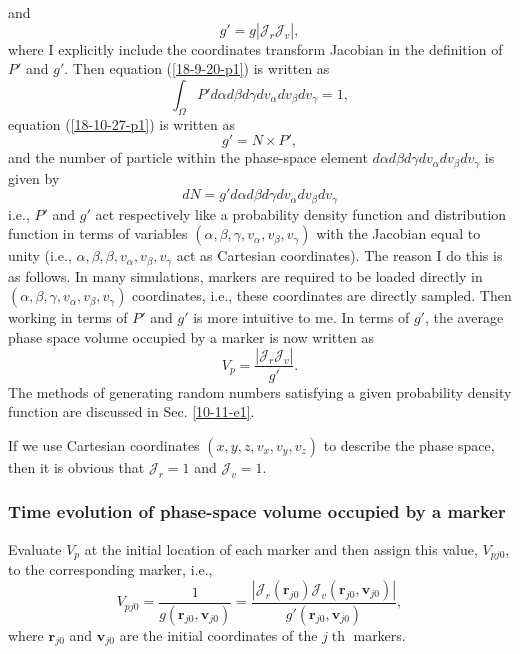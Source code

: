 \documentclass{article}
\newcommand{\tmop}[1]{\ensuremath{\operatorname{#1}}}
\begin{document}
and
\begin{equation}
  g' = g | \mathcal{J}_r \mathcal{J}_v |,
\end{equation}
where I explicitly include the coordinates transform Jacobian in the
definition of $P'$ and $g'$. Then equation (\ref{18-9-20-p1}) is written as
\begin{equation}
  \int_{\Omega} P' d \alpha d \beta d \gamma d v_{\alpha} d v_{\beta} d
  v_{\gamma} = 1,
\end{equation}
equation (\ref{18-10-27-p1}) is written as
\begin{equation}
  g' = N \times P',
\end{equation}
and the number of particle within the phase-space element $d \alpha d \beta d
\gamma d v_{\alpha} d v_{\beta} d v_{\gamma}$ is given by
\begin{equation}
  d N = g' d \alpha d \beta d \gamma d v_{\alpha} d v_{\beta} d v_{\gamma}
\end{equation}
i.e., $P'$ and $g'$ act respectively like a probability density function and
distribution function in terms of variables $(\alpha, \beta, \gamma,
v_{\alpha}, v_{\beta}, v_{\gamma})$ with the Jacobian equal to unity (i.e.,
$\alpha, \beta, \beta, v_{\alpha}, v_{\beta}, v_{\gamma}$ act as Cartesian
coordinates). The reason I do this is as follows. In many simulations, markers
are required to be loaded directly in $(\alpha, \beta, \gamma, v_{\alpha},
v_{\beta}, v_{\gamma})$ coordinates, i.e., these coordinates are directly
sampled. Then working in terms of $P'$ and $g'$ is more intuitive to me. In
terms of $g'$, the average phase space volume occupied by a marker is now
written as
\begin{equation}
  \label{18-1-28-p3} V_p = \frac{| \mathcal{J}_r \mathcal{J}_v |}{g'} .
\end{equation}
The methods of generating random numbers satisfying a given probability
density function are discussed in Sec. \ref{10-11-e1}.

If we use Cartesian coordinates $(x, y, z, v_x, v_y, v_z)$ to describe the
phase space, then it is obvious that $\mathcal{J}_r = 1$ and $\mathcal{J}_v =
1$.

\subsubsection{Time evolution of phase-space volume occupied by a marker}

Evaluate $V_p$ at the initial location of each marker and then assign this
value, $V_{p j 0}$, to the corresponding marker, i.e.,
\begin{equation}
  V_{p j 0} = \frac{1}{g (\mathbf{r}_{j 0}, \mathbf{v}_{j 0})} = \frac{|
  \mathcal{J}_r (\mathbf{r}_{j 0}) \mathcal{J}_v (\mathbf{r}_{j 0},
  \mathbf{v}_{j 0}) |}{g' (\mathbf{r}_{j 0}, \mathbf{v}_{j 0})},
\end{equation}
where $\mathbf{r}_{j 0}$ and $\mathbf{v}_{j 0}$ are the initial coordinates of
the $j \tmop{th}$ markers.
\end{document}
